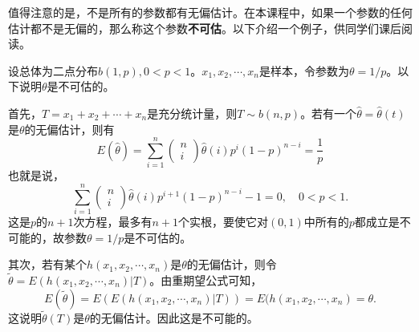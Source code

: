 值得注意的是，不是所有的参数都有无偏估计。在本课程中，如果一个参数的任何估计都不是无偏的，那么称这个参数\textbf{不可估}。以下介绍一个例子，供同学们课后阅读。
\begin{example}
设总体为二点分布$b(1,p),0<p<1$。$x_1,x_2,\cdots,x_n$是样本，令参数为$\theta = 1/p$。以下说明$\theta$是不可估的。    

首先，$T = x_1+x_2+\cdots+x_n$是充分统计量，则$T\sim b(n,p)$。若有一个$\hat{\theta} = \hat{\theta}(t)$是$\theta$的无偏估计，则有
$$
E(\hat{\theta}) = \sum_{i=1}^n \begin{pmatrix}
    n\\i
\end{pmatrix}
\hat{\theta}(i) p^{i}(1-p)^{n-i} = \frac{1}{p}
$$
也就是说，
$$
\sum_{i=1}^n \begin{pmatrix}
    n\\i
\end{pmatrix}
\hat{\theta}(i) p^{i+1}(1-p)^{n-i} -1 =0, \quad 0 < p < 1.
$$
这是$p$的$n+1$次方程，最多有$n+1$个实根，要使它对$(0,1)$中所有的$p$都成立是不可能的，故参数$\theta = 1/p$是不可估的。

其次，若有某个$h(x_1,x_2,\cdots,x_n)$是$\theta$的无偏估计，则令$\tilde{\theta} = E(h(x_1,x_2,\cdots,x_n)|T)$。由重期望公式可知，
$$
E(\tilde{\theta}) = E(E(h(x_1,x_2,\cdots,x_n)|T)) = E(h(x_1,x_2,\cdots,x_n) = \theta.
$$
这说明$\tilde{\theta}(T)$是$\theta$的无偏估计。因此这是不可能的。
\end{example}
